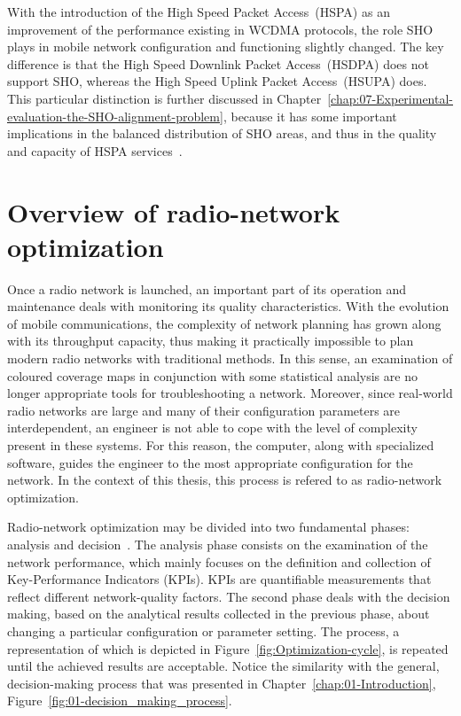 With the introduction of the High Speed Packet Access~(HSPA)
as an improvement of the performance existing in WCDMA protocols,
the role SHO plays in mobile network configuration and functioning
slightly changed. The key difference is that the High Speed Downlink
Packet Access~(HSDPA)
does not support SHO, whereas the High Speed Uplink Packet Access~(HSUPA)
does. This particular distinction is further discussed in Chapter~\ref{chap:07-Experimental-evaluation-the-SHO-alignment-problem},
because it has some important implications in the balanced distribution
of SHO areas, and thus in the quality and capacity of HSPA services~\cite{holma2006hsdpa}.


\chapter{Overview of radio-network optimization \label{chap:02-Optimization_of_radio_networks}}

Once a radio network is launched, an important part of its operation
and maintenance deals with monitoring its quality characteristics.
With the evolution of mobile communications, the complexity of network
planning has grown along with its throughput capacity, thus making
it practically impossible to plan modern radio networks with traditional
methods. In this sense, an examination of coloured coverage maps in
conjunction with some statistical analysis are no longer appropriate
tools for troubleshooting a network. Moreover, since real-world radio
networks are large and many of their configuration parameters are
interdependent, an engineer is not able to cope with the level of
complexity present in these systems. For this reason, the computer,
along with specialized software, guides the engineer to the most appropriate
configuration for the network. In the context of this thesis, this
process is refered to as radio-network optimization.

Radio-network optimization may be divided into two fundamental phases:
analysis and decision~\cite{Nawrocki-Understanding_UMTS_radio_network_modelling_and_optimisation:2006}.
The analysis phase consists on the examination of the network performance,
which mainly focuses on the definition and collection of Key-Performance
Indicators (KPIs).
KPIs are quantifiable measurements that reflect different network-quality
factors. The second phase deals with the decision making, based on
the analytical results collected in the previous phase, about changing
a particular configuration or parameter setting. The process, a representation
of which is depicted in Figure~\ref{fig:Optimization-cycle}, is
repeated until the achieved results are acceptable. Notice the similarity
with the general, decision-making process that was presented in Chapter~\ref{chap:01-Introduction},
Figure~\ref{fig:01-decision_making_process}.

